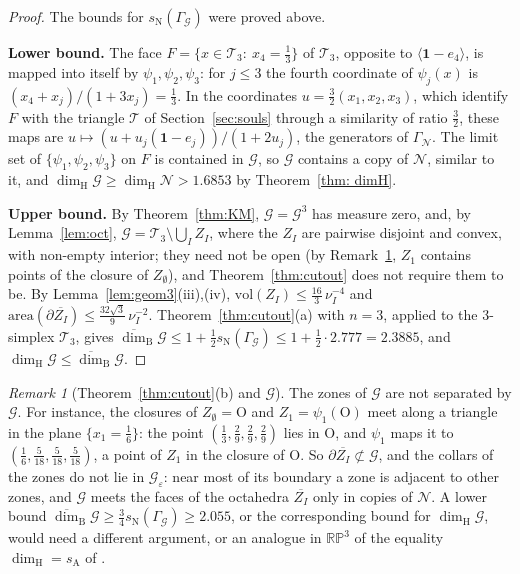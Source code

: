 \documentclass[11pt]{amsart}
\theoremstyle{definition}
\theoremstyle{remark}
\newtheorem{remark}[proposition]{Remark}
\newcommand{\one}{\mathbf 1}
\newcommand{\RP}{\mathbb{RP}}
\newcommand{\cN}{\mathcal N}
\newcommand{\cT}{\mathcal T}
\newcommand{\GN}{\Gamma_{\mathcal N}}
\newcommand{\cG}{\mathcal G}
\newcommand{\GG}{\Gamma_{\mathcal G}}
\newcommand{\Oct}{\mathrm{O}}
\newcommand{\udimB}{\overline{\dim}_{\mathrm B}}
\newcommand{\sN}{s_{\mathrm N}}
\newcommand{\sA}{s_{\mathrm A}}
\newcommand{\dimH}{\dim_{\mathrm H}}
\newcommand{\pr}[1]{\langle #1\rangle}
\begin{document}
\thmthreed*

\begin{proof}
The bounds for $\sN(\GG)$ were proved above.

\textbf{Lower bound.} The face $F=\{x\in \cT_3:\ x_4=\frac13\}$ of $\cT_3$, opposite to $\pr{\one-e_4}$, is mapped into itself by $\psi_1,\psi_2,\psi_3$: for $j\le3$ the fourth coordinate of $\psi_j(x)$ is $(x_4+x_j)/(1+3x_j)=\frac13$. In the coordinates $u=\frac32(x_1,x_2,x_3)$, which identify $F$ with the triangle $\cT$ of Section~\ref{sec:souls} through a similarity of ratio $\frac32$, these maps are $u\mapsto(u+u_j(\one-e_j))/(1+2u_j)$, the generators of $\GN$. The limit set of $\{\psi_1,\psi_2,\psi_3\}$ on $F$ is contained in $\cG$, so $\cG$ contains a copy of $\cN$, similar to it, and $\dimH\cG\ge\dimH\cN>1.6853$ by Theorem~\ref{thm: dimH}.

\textbf{Upper bound.} By Theorem~\ref{thm:KM}, $\cG=\mathcal G^3$ has measure zero, and, by Lemma~\ref{lem:oct}, $\cG=\cT_3\setminus\bigcup_IZ_I$, where the $Z_I$ are pairwise disjoint and convex, with non-empty interior; they need not be open (by Remark~\ref{rem:octfaces}, $Z_1$ contains points of the closure of $Z_\emptyset$), and Theorem~\ref{thm:cutout} does not require them to be. By Lemma~\ref{lem:geom3}(iii),(iv), $\mathrm{vol}(Z_I)\le\frac{16}3\,\nu_I^{-4}$ and $\mathrm{area}(\partial\overline{Z_I})\le\frac{32\sqrt3}9\,\nu_I^{-2}$. Theorem~\ref{thm:cutout}(a) with $n=3$, applied to the $3$-simplex $\cT_3$, gives $\udimB\cG\le1+\frac12\sN(\GG)\le1+\frac12\cdot2.777=2.3885$, and $\dimH\cG\le\udimB\cG$.
\end{proof}

\begin{remark}[Theorem~\ref{thm:cutout}(b) and $\cG$]\label{rem:octfaces}
The zones of $\cG$ are not separated by $\cG$. For instance, the closures of $Z_\emptyset=\Oct$ and $Z_1=\psi_1(\Oct)$ meet along a triangle in the plane $\{x_1=\frac16\}$: the point $(\frac13,\frac29,\frac29,\frac29)$ lies in $\Oct$, and $\psi_1$ maps it to $(\frac16,\frac5{18},\frac5{18},\frac5{18})$, a point of $Z_1$ in the closure of $\Oct$. So $\partial\overline{Z_I}\not\subset\cG$, and the collars of the zones do not lie in $\cG_\varepsilon$: near most of its boundary a zone is adjacent to other zones, and $\cG$ meets the faces of the octahedra $\overline{Z_I}$ only in copies of $\cN$. A lower bound $\udimB\cG\ge\frac34\sN(\GG)\ge2.055$, or the corresponding bound for $\dimH\cG$, would need a different argument, or an analogue in $\RP^3$ of the equality $\dimH=\sA$ of \cite{JLPX23,Jur26}.
\end{remark}
\end{document}
